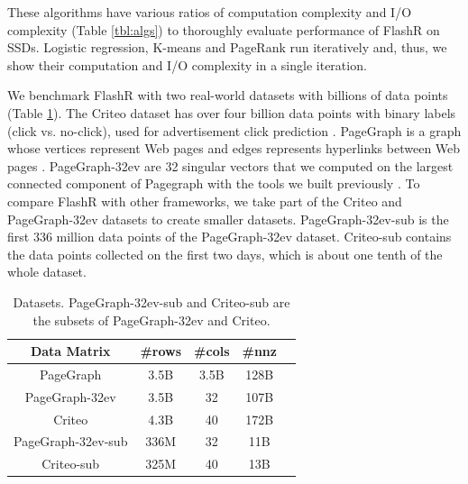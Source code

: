 These algorithms have various ratios of computation complexity and I/O complexity
(Table \ref{tbl:algs}) to thoroughly evaluate performance of FlashR on SSDs.
Logistic regression, K-means and PageRank run iteratively and, thus, we show
their computation and I/O complexity in a single iteration.

We benchmark FlashR with two real-world datasets with billions of data points
(Table \ref{tbl:data}). The Criteo dataset has over four billion data points
with binary labels (click vs. no-click), used for advertisement click
prediction \cite{criteo}. PageGraph is a graph whose vertices represent Web pages
and edges represents hyperlinks between Web pages \cite{webgraph}. PageGraph-32ev
are 32 singular vectors that we computed on the largest connected component of
Pagegraph with the tools we built previously \cite{flashgraph, SEM_SpMM}.
To compare FlashR with other frameworks, we take part of the Criteo and
PageGraph-32ev datasets to
create smaller datasets. PageGraph-32ev-sub is the first 336 million data points
of the PageGraph-32ev dataset. Criteo-sub contains the data points collected
on the first two days, which is about one tenth of the whole dataset.

\begin{table}
\begin{center}
\caption{Datasets. PageGraph-32ev-sub and Criteo-sub are the subsets of
PageGraph-32ev and Criteo.}
\vspace{-10pt}
\footnotesize
\begin{tabular}{|c|c|c|c|c|}
\hline
Data Matrix & \#rows & \#cols & \#nnz \\
\hline
PageGraph \cite{webgraph} & 3.5B & 3.5B & 128B \\
\hline
PageGraph-32ev \cite{webgraph} & 3.5B & 32 & 107B \\
\hline
Criteo \cite{criteo} & 4.3B & 40 & 172B \\
\hline
PageGraph-32ev-sub \cite{webgraph} & 336M & 32 & 11B \\
\hline
Criteo-sub \cite{criteo} & 325M & 40 & 13B \\
\hline
\end{tabular}
\normalsize
\label{tbl:data}
\end{center}
\end{table}

